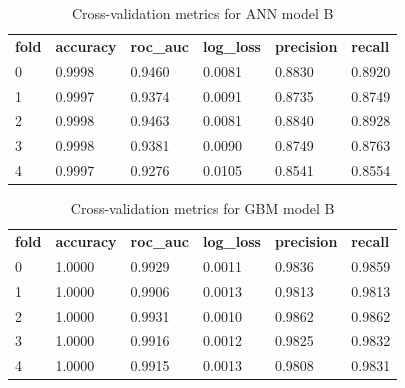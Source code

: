 \documentclass{article}
\begin{document}
\begin{table}[H]
\begin{tabular}{llllll}
\textbf{fold} & \textbf{accuracy} & \textbf{roc\_auc} & \textbf{log\_loss} & \textbf{precision} & \textbf{recall} \\
0             & 0.9998            & 0.9460            & 0.0081             & 0.8830             & 0.8920          \\
1             & 0.9997            & 0.9374            & 0.0091             & 0.8735             & 0.8749          \\
2             & 0.9998            & 0.9463            & 0.0081             & 0.8840             & 0.8928          \\
3             & 0.9998            & 0.9381            & 0.0090             & 0.8749             & 0.8763          \\
4             & 0.9997            & 0.9276            & 0.0105             & 0.8541             & 0.8554         
\end{tabular}
\caption{Cross-validation metrics for ANN model B}
\end{table}

\begin{table}[]
\begin{tabular}{llllll}
\textbf{fold} & \textbf{accuracy} & \textbf{roc\_auc} & \textbf{log\_loss} & \textbf{precision} & \textbf{recall} \\
0             & 1.0000            & 0.9929            & 0.0011             & 0.9836             & 0.9859          \\
1             & 1.0000            & 0.9906            & 0.0013             & 0.9813             & 0.9813          \\
2             & 1.0000            & 0.9931            & 0.0010             & 0.9862             & 0.9862          \\
3             & 1.0000            & 0.9916            & 0.0012             & 0.9825             & 0.9832          \\
4             & 1.0000            & 0.9915            & 0.0013             & 0.9808             & 0.9831         
\end{tabular}
\caption{Cross-validation metrics for GBM model B}
\end{table}
\end{document}
